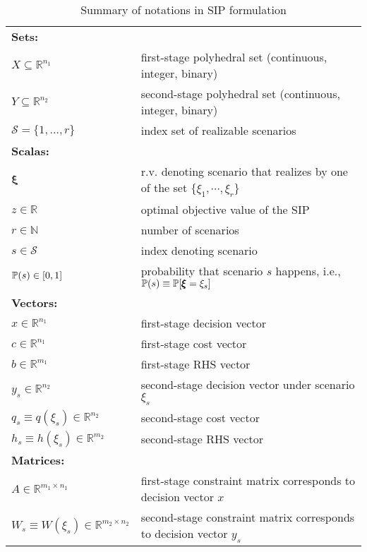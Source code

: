 \begin{table}[]
	\caption{Summary of notations in SIP formulation}
	\label{notation:SIP}
	\resizebox{\textwidth}{!}
	{
		\begin{tabular}{ll}
			\toprule
			\multicolumn{2}{l}{\textbf{Sets:}} \\ 
			$X\subseteq\mathbb{R}^{n_1}$	& first-stage polyhedral set (continuous, integer, binary)\\
			$Y\subseteq\mathbb{R}^{n_2}$	& second-stage polyhedral set (continuous, integer, binary)\\ 
			$\mathcal{S}=\{1,\ldots,r\}$	& index set of realizable scenarios \\ \midrule
			\multicolumn{2}{l}{\textbf{Scalas:}} \\ 
			$\pmb{\xi}$	& r.v. denoting scenario that realizes by one of the set $\{\xi_1,\cdots,\xi_r\}$ 	\\			
			$z\in\mathbb{R}$ & optimal objective value of the SIP \\ 
			$r\in\mathbb{N}$	& number of scenarios	\\	
			$s\in\mathcal{S}$	& index denoting scenario	\\
			$\operatorname*{\mathbb{P}}(s)\in[0,1]$ & probability that scenario $s$ happens, i.e., $\operatorname*{\mathbb{P}}(s)\equiv\operatorname*{\mathbb{P}}[\pmb{\xi}=\xi_s]$ \\ \midrule
			\multicolumn{2}{l}{\textbf{Vectors:}} \\  
			$x\in\mathbb{R}^{n_1}$	& first-stage decision vector	\\
			$c\in \mathbb{R}^{n_1}$	& first-stage cost vector\\
			$b\in\mathbb{R}^{m_1}$	& first-stage RHS vector\\
			$y_s\in\mathbb{R}^{n_2}$	& second-stage decision vector under scenario $\xi_s$	\\
			$q_s\equiv q(\xi_s)\in\mathbb{R}^{n_2}$	& second-stage cost vector \\
			$h_s\equiv h(\xi_s)\in\mathbb{R}^{m_2}$	& second-stage RHS vector\\ \midrule
			\multicolumn{2}{l}{\textbf{Matrices:}} \\  
			$A\in\mathbb{R}^{m_1\times n_1}$	& first-stage constraint matrix corresponds to decision vector $x$\\
			$W_s\equiv W(\xi_s)\in\mathbb{R}^{m_2\times n_2}$	& second-stage constraint matrix corresponds to decision vector $y_s$\\

\end{tabular}}
\end{table}
